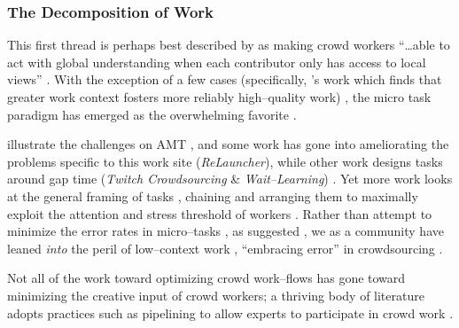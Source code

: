 \documentclass[trackingWork]{subfiles}
\begin{document}
\subsubsection[the decomposition of work]{The Decomposition of Work}\label{sec:decomposition}

\subsubsubsection{\crowdworkpers}
This first thread is
perhaps best described by \citeauthor{verroios2014context} as
making crowd workers ``\dots able to act with
global understanding when each contributor only has access to local views''
\cite{verroios2014context}.
With the exception of a few cases
(specifically, \citeauthor{Kinnaird:2012:WTM:2389176.2389219}'s work
which finds that greater work context fosters more reliably high--quality work)%
, the micro task paradigm has emerged as the overwhelming favorite
\cite{selfsourcingTeevan2014,selfsourcingTeevan2016%
,       cheng2015break,Kinnaird:2012:WTM:2389176.2389219}.


\citeauthor{taskSearch} illustrate the challenges on AMT%
, and some work has gone into ameliorating the problems specific to this work site
(\textit{ReLauncher}), %
while other work designs tasks around gap time
(\textit{Twitch Crowdsourcing} \& \textit{Wait--Learning})
\cite{taskSearch,KucherbaevReLauncher,Vaish:2014:TCC:2611222.2556996%
,       Cai:2015:WLW:2702123.2702267}.
Yet more work looks at the general framing of tasks%
, chaining and arranging them to maximally exploit
the attention and stress threshold %
of workers
\cite{Cai:2016:CRI:2858036.2858237}.
Rather than attempt to minimize the error rates in micro--tasks%
, as \citeauthor{Kinnaird:2012:WTM:2389176.2389219} suggested%
, we as a community have leaned \textit{into} the peril of
low--context work%
, ``embracing error'' in crowdsourcing
\cite{embracingErrorKrishna}.

Not all of the work toward optimizing crowd work--flows has gone toward
minimizing the creative input of crowd workers;
a thriving body of literature adopts
practices such as pipelining to allow experts to participate in crowd work
\cite{foundry}.
\end{document}
